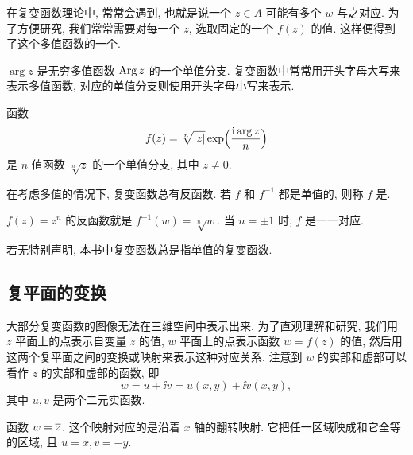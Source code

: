 在复变函数理论中, 常常会遇到, 也就是说一个 $z\in A$ 可能有多个 $w$ 与之对应.
为了方便研究, 我们常常需要对每一个 $z$, 选取固定的一个 $f(z)$ 的值.
这样便得到了这个多值函数的一个.
\begin{exampleenum}
  \item $\arg z$ 是无穷多值函数 $\operatorname{Arg} z$ 的一个单值分支.
  复变函数中常常用开头字母大写来表示多值函数, 对应的单值分支则使用开头字母小写来表示.
  \item 函数
  \[
    f(z)=\sqrt[n]{\lvert z\rvert}\exp\Bigl(\frac{\mathrm{i}\arg z}n\Bigr)
  \]
  是 $n$ 值函数 $\sqrt[n]z$ 的一个单值分支, 其中 $z\neq 0$.
\end{exampleenum}

在考虑多值的情况下, 复变函数总有反函数.
若 $f$ 和 $f^{-1}$ 都是单值的, 则称 $f$ 是.

\begin{example}
  $f(z)=z^n$ 的反函数就是 $f^{-1}(w)=\sqrt[n]{w}$.
  {当 $n=\pm1$ 时, $f$ 是一一对应.}
\end{example}

若无特别声明, 本书中\alert{复变函数总是指单值的复变函数}.


\subsection{复平面的变换}

大部分复变函数的图像无法在三维空间中表示出来.
为了直观理解和研究, 我们用 $z$ 平面上的点表示自变量 $z$ 的值, $w$ 平面上的点表示函数 $w=f(z)$ 的值, 然后用这两个复平面之间的变换或映射来表示这种对应关系.
注意到 $w$ 的实部和虚部可以看作 $z$ 的实部和虚部的函数, 即
\[
  w=u+\ii v=u(x,y)+\ii v(x,y),
\]
其中 $u,v$ 是两个二元实函数.


\begin{example}
  函数 $w=\overline z$.
  这个映射对应的是沿着 $x$ 轴的翻转映射.
  它把任一区域映成和它全等的区域, 且 $u=x,v=-y$.
\end{example}


